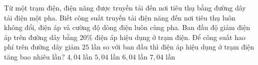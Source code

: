 \begin{vidu}%
	Từ một trạm điện, điện năng được truyền tải đến nơi tiêu thụ bằng đường dây tải điện một pha. Biết công suất truyền tải điện năng đến nơi tiêu thụ luôn không đổi, điện áp và cường độ dòng điện luôn cùng pha. Ban đầu độ giảm điện áp trên đường dây bằng $20\%$ điện áp hiệu dụng ở trạm điện. Để công suất hao phí trên đường dây giảm $25$ lần so với ban đầu thì điện áp hiệu dụng ở trạm điện tăng bao nhiêu lần?
	\choice
	{\True $4,04$ lần}
	{$5,04$ lần}
	{$6,04$ lần}
	{$7,04$ lần}
\end{vidu}
